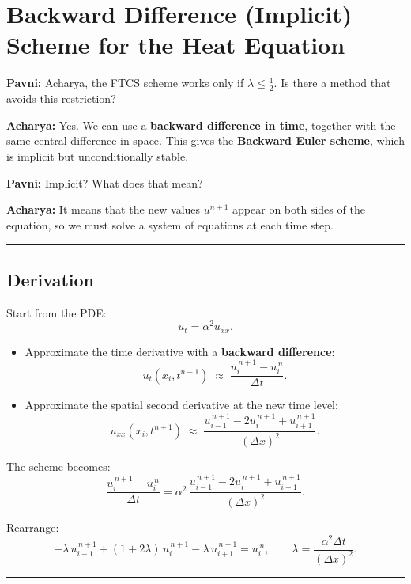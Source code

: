 \documentclass[
  letterpaper,
]{book}
\begin{document}
\section{Backward Difference (Implicit) Scheme for the Heat
Equation}\label{backward-difference-implicit-scheme-for-the-heat-equation}

\textbf{Pavni:} Acharya, the FTCS scheme works only if
\(\lambda \leq \tfrac{1}{2}\). Is there a method that avoids this
restriction?

\textbf{Acharya:} Yes. We can use a \textbf{backward difference in
time}, together with the same central difference in space. This gives
the \textbf{Backward Euler scheme}, which is implicit but
unconditionally stable.

\textbf{Pavni:} Implicit? What does that mean?

\textbf{Acharya:} It means that the new values \(u^{n+1}\) appear on
both sides of the equation, so we must solve a system of equations at
each time step.

\begin{center}\rule{0.5\linewidth}{0.5pt}\end{center}

\subsection{Derivation}\label{derivation}

Start from the PDE: \[
u_t = \alpha^2 u_{xx}.
\]

\begin{itemize}
\item
  Approximate the time derivative with a \textbf{backward difference}:
  \[
  u_t(x_i,t^{n+1}) \;\approx\; \frac{u_i^{\,n+1} - u_i^{\,n}}{\Delta t}.
  \]
\item
  Approximate the spatial second derivative at the new time level: \[
  u_{xx}(x_i,t^{n+1}) \;\approx\; \frac{u_{i-1}^{\,n+1} - 2u_i^{\,n+1} + u_{i+1}^{\,n+1}}{(\Delta x)^2}.
  \]
\end{itemize}

The scheme becomes: \[
\frac{u_i^{\,n+1} - u_i^{\,n}}{\Delta t} 
= \alpha^2 \,\frac{u_{i-1}^{\,n+1} - 2u_i^{\,n+1} + u_{i+1}^{\,n+1}}{(\Delta x)^2}.
\]

Rearrange: \[
- \lambda\, u_{i-1}^{\,n+1} + (1+2\lambda)\,u_i^{\,n+1} - \lambda\, u_{i+1}^{\,n+1} = u_i^{\,n},
\qquad 
\lambda = \frac{\alpha^2 \Delta t}{(\Delta x)^2}.
\]

\begin{center}\rule{0.5\linewidth}{0.5pt}\end{center}
\end{document}
